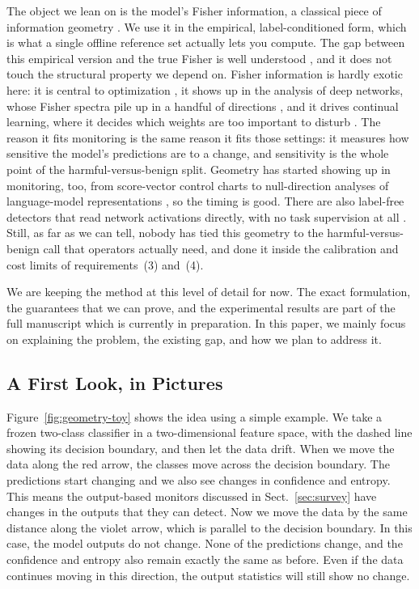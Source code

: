 \documentclass[graybox]{SNmult}
\begin{document}
The object we lean on is the model's Fisher information, a classical
piece of information geometry \cite{amari1998natural}. We use it in the
empirical, label-conditioned form, which is what a single offline
reference set actually lets you compute. The gap between this empirical
version and the true Fisher is well understood
\cite{kunstner2019empirical}, and it does not touch the structural
property we depend on. Fisher information is hardly exotic here: it is
central to optimization \cite{martens2015kfac}, it shows up in the
analysis of deep networks, whose Fisher spectra pile up in a handful of
directions \cite{karakida2019universal}, and it drives continual
learning, where it decides which weights are too important to disturb
\cite{kirkpatrick2017overcoming}. The reason it fits monitoring is the
same reason it fits those settings: it measures how sensitive the
model's predictions are to a change, and sensitivity is the whole point
of the harmful-versus-benign split. Geometry has started showing up in
monitoring, too, from score-vector control charts \cite{zhang2023score}
to null-direction analyses of language-model representations
\cite{pandey2025zdp}, so the timing is good. There are also label-free
detectors that read network activations directly, with no task
supervision at all \cite{komorniczak2024parallel}. Still, as far as we
can tell, nobody has tied this geometry to the harmful-versus-benign
call that operators actually need, and done it inside the calibration
and cost limits of requirements~(3) and~(4).

We are keeping the method at this level of detail for now. The exact formulation, the guarantees that we can prove, and the experimental results are part of the full manuscript which is currently in preparation. In this paper, we mainly focus on explaining the problem, the existing gap, and how we plan to address it.


\subsection{A First Look, in Pictures}
\label{sec:glimpse}

Figure~\ref{fig:geometry-toy} shows the idea using a simple example. We take a frozen two-class classifier in a two-dimensional feature space, with the dashed line showing its decision boundary, and then let the data drift. When we move the data along the red arrow, the classes move across the decision boundary. The predictions start changing and we also see changes in confidence and entropy. This means the output-based monitors discussed in
Sect.~\ref{sec:survey} have changes in the outputs that they can detect. Now we move the data by the same distance along the violet arrow, which is parallel to the decision boundary. In this case, the model outputs do not change. None of the predictions change, and the confidence and entropy also remain exactly the same as before. Even if the data continues moving in this direction, the output statistics will still show no change.
\end{document}
